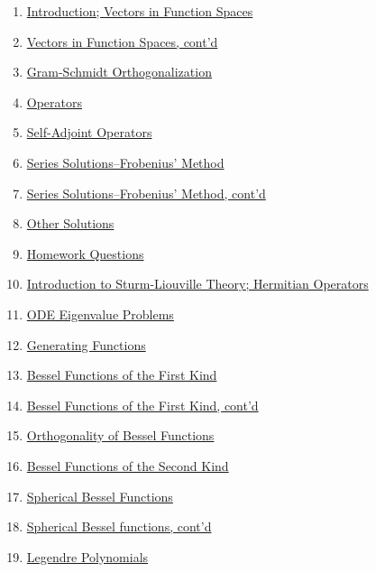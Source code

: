 \documentclass[11pt]{article}
\begin{document}
\begin{enumerate}
	\item \href{https://mp.weixin.qq.com/s/p4r0FcBSapMEp1suvBBfXw}{Introduction; Vectors in Function Spaces}	%
	\item \href{https://mp.weixin.qq.com/s/FyF38iYCjlUJX047nyknkg}{Vectors in Function Spaces, cont'd}	%
	\item \href{https://mp.weixin.qq.com/s/IPIoAKrsIIx--mbPNLFqiA}{Gram-Schmidt Orthogonalization}	%
	\item \href{https://mp.weixin.qq.com/s/1SjsT21yNcsLvvDRm0bmag}{Operators}	%
	\item \href{https://mp.weixin.qq.com/s/_l2hoJqkP15ccAVyBDo-Eg}{Self-Adjoint Operators}	%
	\item \href{https://mp.weixin.qq.com/s/BUoaEH1RW49yUADRSlBawA}{Series Solutions--Frobenius' Method}	%
	\item \href{https://mp.weixin.qq.com/s/OrA29RODjzvP8J--k9V2UQ}{Series Solutions--Frobenius' Method, cont'd}	%
	\item \href{https://mp.weixin.qq.com/s/tsfGdMMD2v2WDpB2xYFaDA}{Other Solutions}	%
	\item \href{https://mp.weixin.qq.com/s/3EOn8WF0Io-68jNS1QnOdg}{Homework Questions}	%
	\item \href{https://mp.weixin.qq.com/s/5ymF_aVBb5FEvWvcY3VnyA}{Introduction to Sturm-Liouville Theory; Hermitian Operators}	%
	\item \href{https://mp.weixin.qq.com/s/YFFeefBQFm9QHIsTSr3rWQ}{ODE Eigenvalue Problems}	%
	\item \href{https://mp.weixin.qq.com/s/XdcXBfNHDWilR1V3NpWChQ}{Generating Functions}	%
	\item \href{https://mp.weixin.qq.com/s/cA64j0haLjzZlBsRxEJdCw}{Bessel Functions of the First Kind}	%
	\item \href{https://mp.weixin.qq.com/s/afx14hb8rbW_s7mSc5AO6w}{Bessel Functions of the First Kind, cont'd}	%
	\item \href{https://mp.weixin.qq.com/s/zaD-59oxxlt57cbDfhEjhQ}{Orthogonality of Bessel Functions}	%
	\item \href{https://mp.weixin.qq.com/s/CVX7b_BU_jN1cDeBqMQL8Q}{Bessel Functions of the Second Kind}	%
	\item \href{https://mp.weixin.qq.com/s/T98smKOaYVnd4bmDgI_Jsw}{Spherical Bessel Functions}	%
	\item \href{https://mp.weixin.qq.com/s/8Tm_eSAHtTXqh8opDbYVwQ}{Spherical Bessel functions, cont'd}	%
	\item \href{https://mp.weixin.qq.com/s/HmH705LWUP-RFffXL4yxHQ}{Legendre Polynomials}	%

\end{enumerate}
\end{document}
